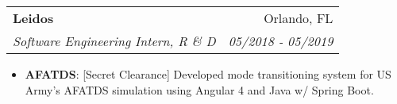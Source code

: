 \documentclass[letterpaper,11pt]{article}
\makeatletter
\newcommand{\resumeItem}[2]{
  \item\small{
    \textbf{#1}{: #2 \vspace{-2pt}}
  }
}
\newcommand{\resumeSubheading}[4]{
  \vspace{-1pt}\item
    \begin{tabular*}{0.97\textwidth}{l@{\extracolsep{\fill}}r}
      \textbf{#1} & #2 \\
      \textit{\small#3} & \textit{\small #4} \\
    \end{tabular*}\vspace{-5pt}
}
\newcommand{\resumeSubItem}[2]{\resumeItem{#1}{#2}\vspace{-4pt}}
\newcommand{\resumeItemListStart}{\begin{itemize}}
\newcommand{\resumeItemListEnd}{\end{itemize}\vspace{-5pt}}
\makeatother
\begin{document}
        
        
       

   

        

    \resumeSubheading
      {Leidos}{Orlando, FL}
      {Software Engineering Intern, R \& D}{05/2018 - 05/2019}
      \resumeItemListStart
        \resumeItem{AFATDS}{[Secret Clearance] Developed mode transitioning system for US Army's AFATDS simulation using Angular 4 and Java w/ Spring Boot.}
       
      \resumeItemListEnd

\end{document}
